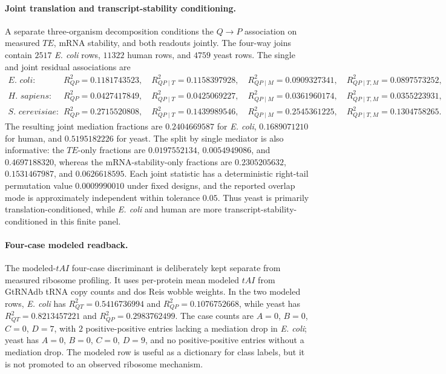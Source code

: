 \paragraph{Joint translation and transcript-stability conditioning.}
A separate three-organism decomposition conditions the $Q\to P$ association on measured $TE$, mRNA stability, and both readouts jointly.  The four-way joins contain $2517$ \textit{E. coli} rows, $11322$ human rows, and $4759$ yeast rows.  The single and joint residual associations are
$$
\begin{aligned}
\textit{E. coli}:\quad &R^{2}_{QP}=0.1181743523,\quad R^{2}_{QP\mid T}=0.1158397928,\quad R^{2}_{QP\mid M}=0.0909327341,\quad R^{2}_{QP\mid T,M}=0.0897573252,\\
\textit{H. sapiens}:\quad &R^{2}_{QP}=0.0427417849,\quad R^{2}_{QP\mid T}=0.0425069227,\quad R^{2}_{QP\mid M}=0.0361960174,\quad R^{2}_{QP\mid T,M}=0.0355223931,\\
\textit{S. cerevisiae}:\quad &R^{2}_{QP}=0.2715520808,\quad R^{2}_{QP\mid T}=0.1439989546,\quad R^{2}_{QP\mid M}=0.2545361225,\quad R^{2}_{QP\mid T,M}=0.1304758265.
\end{aligned}
$$
The resulting joint mediation fractions are $0.2404669587$ for \textit{E. coli}, $0.1689071210$ for human, and $0.5195182226$ for yeast.  The split by single mediator is also informative: the $TE$-only fractions are $0.0197552134$, $0.0054949086$, and $0.4697188320$, whereas the mRNA-stability-only fractions are $0.2305205632$, $0.1531467987$, and $0.0626618595$.  Each joint statistic has a deterministic right-tail permutation value $0.0009990010$ under fixed designs, and the reported overlap mode is approximately independent within tolerance $0.05$.  Thus yeast is primarily translation-conditioned, while \textit{E. coli} and human are more transcript-stability-conditioned in this finite panel.

\paragraph{Four-case modeled readback.}
The modeled-$tAI$ four-case discriminant is deliberately kept separate from measured ribosome profiling.  It uses per-protein mean modeled $tAI$ from GtRNAdb tRNA copy counts and dos Reis wobble weights.  In the two modeled rows, \textit{E. coli} has $R^{2}_{QT}=0.5416736994$ and $R^{2}_{QP}=0.1076752668$, while yeast has $R^{2}_{QT}=0.8213457221$ and $R^{2}_{QP}=0.2983762499$.  The case counts are $A=0$, $B=0$, $C=0$, $D=7$, with $2$ positive-positive entries lacking a mediation drop in \textit{E. coli}; yeast has $A=0$, $B=0$, $C=0$, $D=9$, and no positive-positive entries without a mediation drop.  The modeled row is useful as a dictionary for class labels, but it is not promoted to an observed ribosome mechanism.

